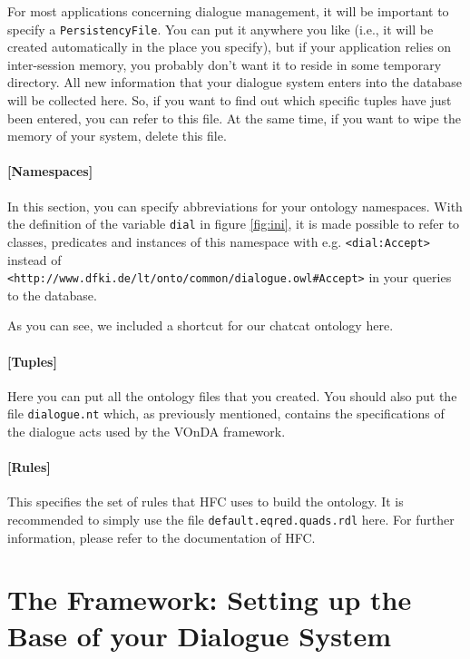 \documentclass[a4paper]{report}
\newcommand{\vonda}{VOnDA\xspace}
\begin{document}
For most applications concerning dialogue management, it will be important to
specify a \texttt{PersistencyFile}. You can put it anywhere you like (i.e., it
will be created automatically in the place you specify), but if your
application relies on inter-session memory, you probably don't want it to
reside in some temporary directory. All new information that your dialogue
system enters into the database will be collected here. So, if you want to find
out which specific tuples have just been entered, you can refer to this
file. At the same time, if you want to wipe the memory of your system, delete
this file.

\paragraph{[Namespaces]}

In this section, you can specify abbreviations for your ontology
namespaces. With the definition of the variable \texttt{dial} in figure
\ref{fig:ini}, it is made possible to refer to classes, predicates and
instances of this namespace with e.g. \texttt{<dial:Accept>} instead of\\
\texttt{<http://www.dfki.de/lt/onto/common/dialogue.owl\#Accept>} in your
queries to the database.

As you can see, we included a shortcut for our chatcat ontology here.

\paragraph{[Tuples]}

Here you can put all the ontology files that you created. You should also put
the file \texttt{dialogue.nt} which, as previously mentioned, contains the
specifications of the dialogue acts used by the \vonda framework.

\paragraph{[Rules]}

This specifies the set of rules that HFC uses to build the ontology. It is
recommended to simply use the file \texttt{default.eqred.quads.rdl} here. For
further information, please refer to the documentation of HFC.


\section{The Framework: Setting up the Base of your Dialogue System}
\end{document}
